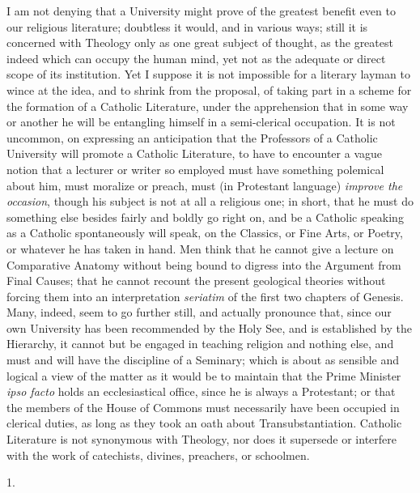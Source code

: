 I am not denying that a University might prove of the greatest
benefit even to our religious literature; doubtless it would, and in
various ways; still it is concerned with Theology only as one great
subject of thought, as the greatest indeed which can occupy the human
mind, yet not as the adequate or direct scope of its institution. Yet
I suppose it is not impossible for a literary layman to wince at the
idea, and to shrink from the proposal, of taking part in a scheme for
the formation of a Catholic Literature, under the apprehension that in
some way or another he will be entangling himself in a semi-clerical
occupation. It is not uncommon, on expressing an anticipation that the
Professors of a Catholic University will promote a Catholic
Literature, to have to encounter a vague notion that a lecturer or
writer so employed must have something polemical about him, must
moralize or preach, must (in Protestant language) \emph{improve the
occasion}, though his subject is not at all a religious one; in
short, that he must do something else besides fairly and boldly go
right on, and be a Catholic speaking as a Catholic spontaneously will
speak, on the Classics, or Fine Arts, or Poetry, or whatever he has
taken in hand. Men think that he cannot give a lecture on Comparative
Anatomy without being bound to digress into the Argument from Final
Causes; that he cannot recount the present geological theories without
forcing them into an interpretation \emph{seriatim} of the first two
chapters of Genesis. Many, indeed, seem to go further still, and
actually pronounce that, since our own University has been recommended
by the Holy See, and is established by the Hierarchy, it cannot but be
engaged in teaching religion and nothing else, and must and will have
the discipline of a Seminary; which is about as sensible and logical a
view of the matter as it would be to maintain that the Prime
Minister \emph{ipso facto} holds an ecclesiastical office, since he is
always a Protestant; or that the members of the House of Commons must
necessarily have been occupied in clerical duties, as long as they
took an oath about Transubstantiation. Catholic Literature is not
synonymous with Theology, nor does it supersede or interfere with the
work of catechists, divines, preachers, or schoolmen.


1.

